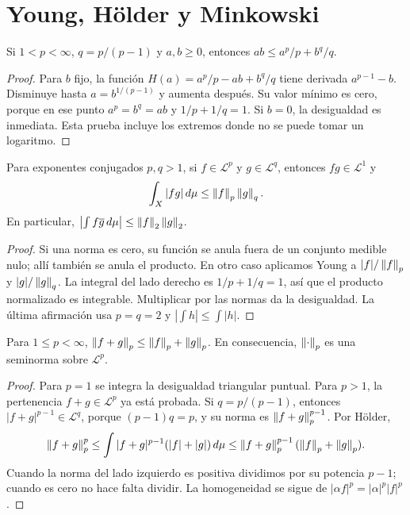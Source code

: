 \section{Young, Hölder y Minkowski}
\begin{lema}[Young]\label{v2:young}
Si $1<p<\infty$, $q=p/(p-1)$ y $a,b\ge0$, entonces $ab\le a^p/p+b^q/q$.
\end{lema}
\begin{proof}
Para $b$ fijo, la función $H(a)=a^p/p-ab+b^q/q$ tiene derivada $a^{p-1}-b$. Disminuye hasta $a=b^{1/(p-1)}$ y aumenta después. Su valor mínimo es cero, porque en ese punto $a^p=b^q=ab$ y $1/p+1/q=1$. Si $b=0$, la desigualdad es inmediata. Esta prueba incluye los extremos donde no se puede tomar un logaritmo.
\end{proof}
\begin{teorema}\label{v2:holder}
Para exponentes conjugados $p,q>1$, si $f\in\mathcal L^p$ y $g\in\mathcal L^q$, entonces $fg\in\mathcal L^1$ y
\[
 \int_X|fg|\,d\mu\le\left\lVert f\right\rVert_p\left\lVert g\right\rVert_q.
\]
En particular, $\left|\int f\overline g\,d\mu\right|\le\left\lVert f\right\rVert_2\left\lVert g\right\rVert_2$.
\end{teorema}
\begin{proof}
Si una norma es cero, su función se anula fuera de un conjunto medible nulo; allí también se anula el producto. En otro caso aplicamos Young a $|f|/\left\lVert f\right\rVert_p$ y $|g|/\left\lVert g\right\rVert_q$. La integral del lado derecho es $1/p+1/q=1$, así que el producto normalizado es integrable. Multiplicar por las normas da la desigualdad. La última afirmación usa $p=q=2$ y $|\int h|\le\int|h|$.
\end{proof}
\begin{teorema}[Minkowski]\label{v2:minkowski}
Para $1\le p<\infty$, $\left\lVert f+g\right\rVert_p\le\left\lVert f\right\rVert_p+\left\lVert g\right\rVert_p$. En consecuencia, $\left\lVert\cdot\right\rVert_p$ es una seminorma sobre $\mathcal L^p$.
\end{teorema}
\begin{proof}
Para $p=1$ se integra la desigualdad triangular puntual. Para $p>1$, la pertenencia $f+g\in\mathcal L^p$ ya está probada. Si $q=p/(p-1)$, entonces $|f+g|^{p-1}\in\mathcal L^q$, porque $(p-1)q=p$, y su norma es $\left\lVert f+g\right\rVert_p^{p-1}$. Por Hölder,
\[
 \left\lVert f+g\right\rVert_p^p\le\int |f+g|^{p-1}(|f|+|g|)\,d\mu
 \le\left\lVert f+g\right\rVert_p^{p-1}(\left\lVert f\right\rVert_p+\left\lVert g\right\rVert_p).
\]
Cuando la norma del lado izquierdo es positiva dividimos por su potencia $p-1$; cuando es cero no hace falta dividir. La homogeneidad se sigue de $|\alpha f|^p=|\alpha|^p|f|^p$.
\end{proof}
